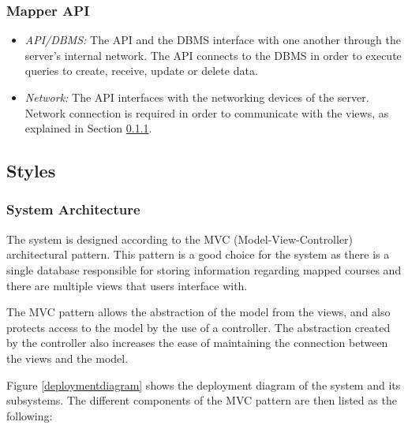 \documentclass{article}
\begin{document}
    \subsubsection{Mapper API}

    \begin{itemize}
        \item \textit{API/DBMS:} The API and the DBMS interface with one another
            through the server's internal network. The API connects to the DBMS in
            order to execute queries to create, receive, update or delete data.
        \item \textit{Network:} The API interfaces with the networking devices of
            the server. Network connection is required in order to communicate with
            the views, as explained in Section \ref{sec:sysarch}.
    \end{itemize}

    \subsection{Styles}

    \subsubsection{System Architecture}
    \label{sec:sysarch}
    
    The system is designed according to the MVC (Model-View-Controller)
    architectural pattern. This pattern is a good choice for the system as
    there is a single database responsible for storing information regarding
    mapped courses and there are multiple views that users interface with.
    
    The MVC pattern allows the abstraction of the model from the views, and
    also protects access to the model by the use of a controller. The
    abstraction created by the controller also increases the ease of
    maintaining the connection between the views and the model.

    Figure \ref{deploymentdiagram} shows the deployment diagram of the system
    and its subsystems. The different components of the MVC pattern are then
    listed as the following:
\end{document}
